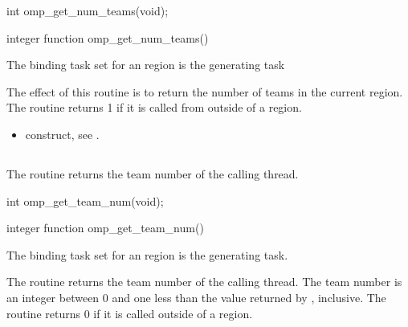 \pagebreak
\format
\ccppspecificstart
\begin{boxedcode}
int omp\_get\_num\_teams(void);
\end{boxedcode}
\ccppspecificend

\fortranspecificstart
\begin{boxedcode}
integer function omp\_get\_num\_teams()
\end{boxedcode}
\fortranspecificend

\binding
The binding task set for an  region is the generating task

\effect
The effect of this routine is to return the number of teams in the current  region. 
The routine returns 1 if it is called from outside of a  region.

\crossreferences
\begin{itemize}
\item {} construct, see 
. 
\end{itemize}










\pagebreak
\subsection{}
\label{subsec:omp_get_team_num}
\summary
The  routine returns the team number of the calling thread.

\format
\ccppspecificstart
\begin{boxedcode}
int omp\_get\_team\_num(void);
\end{boxedcode}
\ccppspecificend

\fortranspecificstart
\begin{boxedcode}
integer function omp\_get\_team\_num()
\end{boxedcode}
\fortranspecificend

\binding
The binding task set for an  region is the generating task.

\effect
The  routine returns the team number of the calling thread. The 
team number is an integer between 0 and one less than the value returned by 
, inclusive. The routine returns 0 if it is called outside of a 
 region.

